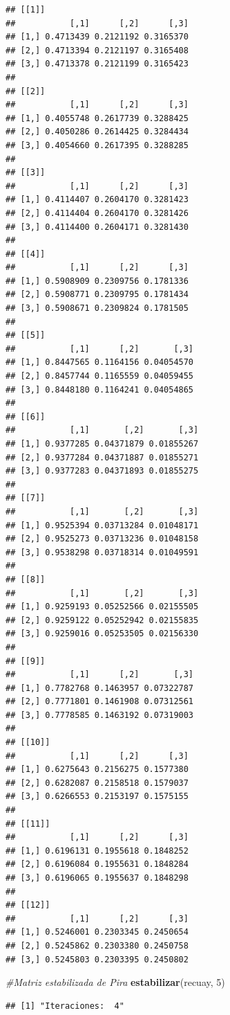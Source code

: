 \documentclass{article}
\newenvironment{Shaded}{\begin{snugshade}}{\end{snugshade}}
\newcommand{\CommentTok}[1]{\textcolor[rgb]{0.56,0.35,0.01}{\textit{#1}}}
\newcommand{\DecValTok}[1]{\textcolor[rgb]{0.00,0.00,0.81}{#1}}
\newcommand{\KeywordTok}[1]{\textcolor[rgb]{0.13,0.29,0.53}{\textbf{#1}}}
\newcommand{\NormalTok}[1]{#1}
\begin{document}
\begin{verbatim}
## [[1]]
##           [,1]      [,2]      [,3]
## [1,] 0.4713439 0.2121192 0.3165370
## [2,] 0.4713394 0.2121197 0.3165408
## [3,] 0.4713378 0.2121199 0.3165423
## 
## [[2]]
##           [,1]      [,2]      [,3]
## [1,] 0.4055748 0.2617739 0.3288425
## [2,] 0.4050286 0.2614425 0.3284434
## [3,] 0.4054660 0.2617395 0.3288285
## 
## [[3]]
##           [,1]      [,2]      [,3]
## [1,] 0.4114407 0.2604170 0.3281423
## [2,] 0.4114404 0.2604170 0.3281426
## [3,] 0.4114400 0.2604171 0.3281430
## 
## [[4]]
##           [,1]      [,2]      [,3]
## [1,] 0.5908909 0.2309756 0.1781336
## [2,] 0.5908771 0.2309795 0.1781434
## [3,] 0.5908671 0.2309824 0.1781505
## 
## [[5]]
##           [,1]      [,2]       [,3]
## [1,] 0.8447565 0.1164156 0.04054570
## [2,] 0.8457744 0.1165559 0.04059455
## [3,] 0.8448180 0.1164241 0.04054865
## 
## [[6]]
##           [,1]       [,2]       [,3]
## [1,] 0.9377285 0.04371879 0.01855267
## [2,] 0.9377284 0.04371887 0.01855271
## [3,] 0.9377283 0.04371893 0.01855275
## 
## [[7]]
##           [,1]       [,2]       [,3]
## [1,] 0.9525394 0.03713284 0.01048171
## [2,] 0.9525273 0.03713236 0.01048158
## [3,] 0.9538298 0.03718314 0.01049591
## 
## [[8]]
##           [,1]       [,2]       [,3]
## [1,] 0.9259193 0.05252566 0.02155505
## [2,] 0.9259122 0.05252942 0.02155835
## [3,] 0.9259016 0.05253505 0.02156330
## 
## [[9]]
##           [,1]      [,2]       [,3]
## [1,] 0.7782768 0.1463957 0.07322787
## [2,] 0.7771801 0.1461908 0.07312561
## [3,] 0.7778585 0.1463192 0.07319003
## 
## [[10]]
##           [,1]      [,2]      [,3]
## [1,] 0.6275643 0.2156275 0.1577380
## [2,] 0.6282087 0.2158518 0.1579037
## [3,] 0.6266553 0.2153197 0.1575155
## 
## [[11]]
##           [,1]      [,2]      [,3]
## [1,] 0.6196131 0.1955618 0.1848252
## [2,] 0.6196084 0.1955631 0.1848284
## [3,] 0.6196065 0.1955637 0.1848298
## 
## [[12]]
##           [,1]      [,2]      [,3]
## [1,] 0.5246001 0.2303345 0.2450654
## [2,] 0.5245862 0.2303380 0.2450758
## [3,] 0.5245803 0.2303395 0.2450802
\end{verbatim}

\begin{Shaded}
\begin{Highlighting}[]
\CommentTok{#Matriz estabilizada de Pira}
\KeywordTok{estabilizar}\NormalTok{(recuay, }\DecValTok{5}\NormalTok{)}
\end{Highlighting}
\end{Shaded}

\begin{verbatim}
## [1] "Iteraciones:  4"
\end{verbatim}
\end{document}
